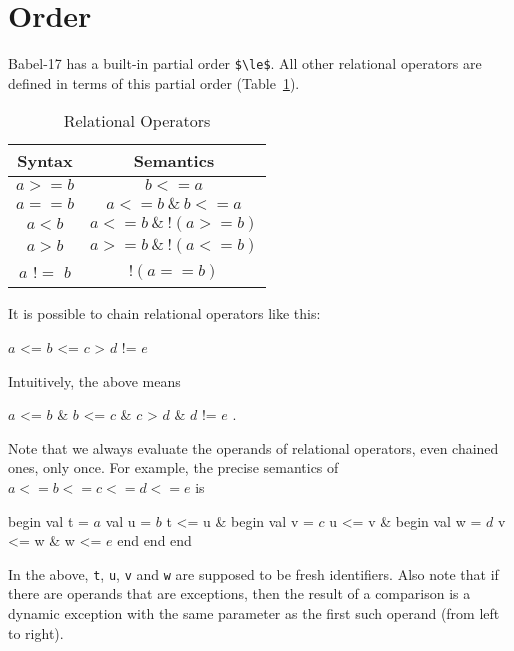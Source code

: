 \documentclass[11pt]{amsart}
\newcommand{\babelsrc}[1] {\lstinline!#1!}
\begin{document}
\section{Order}
Babel-17 has a built-in partial order \babelsrc{$\le$}. All other relational operators are defined in terms of this partial order (Table~\ref{tab:relops}).
\begin{table}
\caption{Relational Operators}
\begin{tabular}{c|c}
\textbf{Syntax} & \textbf{Semantics} \\\hline
$a >= b$ & $b <= a$ \\
$a == b$ & $a <= b\ \&\ b <= a$ \\
$a < b$ & $a <= b\ \&\ !(a >= b)$ \\
$a > b$ & $a >= b\ \&\ !(a <= b)$ \\
$a$ $!=$ $b$ & $! (a == b)$ \\
\end{tabular}
\label{tab:relops}
\end{table}
It is possible to chain relational operators like this:
\begin{babellisting}
$a$ <= $b$ <= $c$ > $d$ != $e$ 
\end{babellisting}
Intuitively, the above means 
\begin{babellisting}
$a$ <= $b$ & $b$ <= $c$  & $c$ > $d$  & $d$ != $e$ .
\end{babellisting}
Note that  we always evaluate the operands  of relational operators, even chained ones, only once. For example, the precise semantics of $a <= b <= c <= d <= e$ is 
\begin{babellisting}
begin
  val t = $a$
  val u = $b$
  t <= u &
  begin
    val v = $c$
    u <= v & 
    begin
      val w = $d$
      v <= w & w <= $e$
    end
  end
end
\end{babellisting}
In the above, \babelsrc{t}, \babelsrc{u}, \babelsrc{v} and \babelsrc{w} are supposed to be fresh identifiers.  Also note that if there are operands that are exceptions, then the result of a comparison is a dynamic exception with the same parameter as the first such operand (from left to right).
\end{document}
